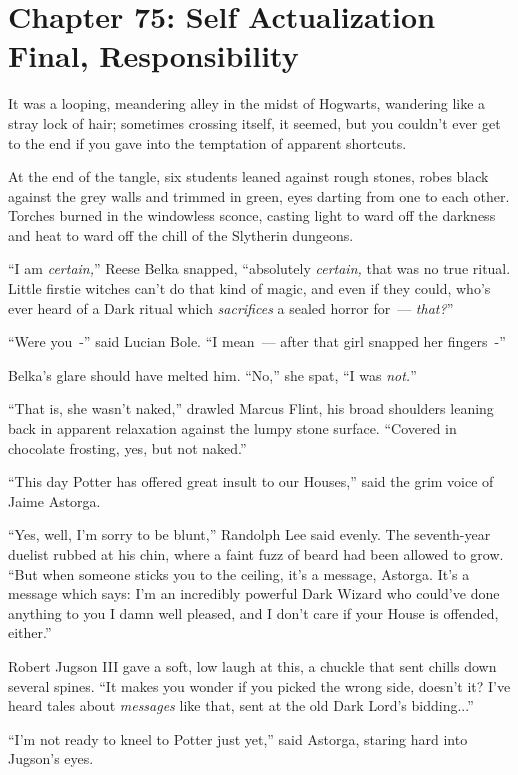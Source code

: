\chapter{Chapter 75: Self Actualization Final, Responsibility}
It was a looping, meandering alley in the midst of Hogwarts, wandering like a stray lock of hair; sometimes crossing itself, it seemed, but you couldn't ever get to the end if you gave into the temptation of apparent shortcuts.

At the end of the tangle, six students leaned against rough stones, robes black against the grey walls and trimmed in green, eyes darting from one to each other. Torches burned in the windowless sconce, casting light to ward off the darkness and heat to ward off the chill of the Slytherin dungeons.

``I am \emph{certain,}'' Reese Belka snapped, ``absolutely \emph{certain,} that was no true ritual. Little firstie witches can't do that kind of magic, and even if they could, who's ever heard of a Dark ritual which \emph{sacrifices} a sealed horror for~--- \emph{that?}''

``Were you~-'' said Lucian Bole. ``I mean~--- after that girl snapped her fingers~-''

Belka's glare should have melted him. ``No,'' she spat, ``I was \emph{not.}''

``That is, she wasn't naked,'' drawled Marcus Flint, his broad shoulders leaning back in apparent relaxation against the lumpy stone surface. ``Covered in chocolate frosting, yes, but not naked.''

``This day Potter has offered great insult to our Houses,'' said the grim voice of Jaime Astorga.

``Yes, well, I'm sorry to be blunt,'' Randolph Lee said evenly. The seventh-year duelist rubbed at his chin, where a faint fuzz of beard had been allowed to grow. ``But when someone sticks you to the ceiling, it's a message, Astorga. It's a message which says: I'm an incredibly powerful Dark Wizard who could've done anything to you I damn well pleased, and I don't care if your House is offended, either.''

Robert Jugson III gave a soft, low laugh at this, a chuckle that sent chills down several spines. ``It makes you wonder if you picked the wrong side, doesn't it? I've heard tales about \emph{messages} like that, sent at the old Dark Lord's bidding...''

``I'm not ready to kneel to Potter just yet,'' said Astorga, staring hard into Jugson's eyes.

